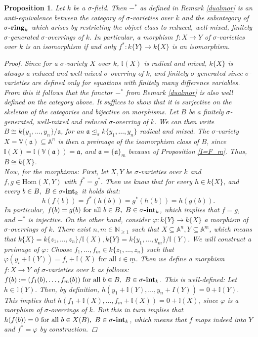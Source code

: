 \documentclass{article}
\def\I{\mathbb{I}}
\def\NE{\mathbb{N}_{\geq1}}
\def\VV{\mathbb{V}}
\def\a{\mathfrak{a}}
\def\s{\sigma}
\def\si{\unlhd_{\sigma}}
\def\Hom{\text{Hom}}
\def\fa{\text{ for all }}
\newcommand{\catname}[1]{{\normalfont\textbf{#1}}}
\newcommand{\sintk}{\s\text{\catname{-int}}_k}
\newcommand{\sringk}{\s\text{\catname{-ring}}_k}
\newenvironment{bew}{\begin{proof}[Proof]}{\end{proof}}
\theoremstyle{plain}
\newtheorem{prop}[Satz]{Proposition}
\theoremstyle{definition}
\begin{document}
\begin{prop}\label{dualisequiv}
Let $k$ be a $\s$-field. Then $-^*$ as defined in Remark \ref{dualmor} is an anti-equivalence between the category of $\s$-varieties over $k$ and the subcategory of $\sringk$ which arises by restricting the object class to reduced, well-mixed, finitely $\s$-generated $\s$-overrings of $k$. 
In particular, a morphism $f: X \rightarrow Y$ of $\s$-varieties over $k$ is an isomorphism if and only $f^*: k\{Y\} \rightarrow k\{X\}$ is an isomorphism.
\begin{bew}
Since for a $\s$-variety $X$ over $k$, $\I(X)$ is radical and mixed, $k\{X\}$ is always a reduced and well-mixed $\s$-overring of $k$, 
and finitely $\s$-generated since $\s$-varieties are defined only for equations with finitely many difference variables. From this it follows that the functor $-^*$ from Remark \ref{dualmor} is also well defined on the category above.
It suffices to show that it is surjective on the skeleton of the categories and bijective on morphisms. 
Let $B$ be a finitely $\s$-generated, well-mixed and reduced $\s$-overring of $k$. We can then write $B \cong k\{y_1,\ldots,y_n\}/\a$, for an $\a \si k\{y_1,\ldots,y_n\}$ radical and mixed. The $\s$-variety $X = \VV(\a) \subseteq \mathbb{A}^n$
is then a preimage of the isomorphism class of $B$, since $\I(X) = \I(\VV(\a)) = \a$, and $\a = \{ \a \}_m$ because of Proposition \ref{I=F_m}. Thus, $B \cong k\{X\}$. \\
\indent Now, for the morphisms: First, let $X,Y$ be $\s$-varieties over $k$ and $f,g \in \Hom(X,Y)$ with $f^* = g^*$. Then we know that for every $h \in k\{X\}$, and every $b \in B, ~ B \in \sintk$ it holds that:
\[ h(f(b)) = f^*(h(b)) = g^*(h(b)) = h(g(b)). \]
In particular, $f(b) = g(b) \fa b \in B, ~ B \in \sintk$, which implies that $f = g$, and $-^*$ is injective. 
On the other hand, consider $\varphi: k\{Y\} \rightarrow k\{X\}$ a morphism of $\s$-overrings of $k$. There exist $n,m \in \NE$ such that $X \subseteq \mathbb{A}^n, Y \subseteq \mathbb{A}^m$,
 which means that $k\{X\} = k\{z_1,\ldots,z_n\}/\I(X), k\{Y\} = k\{y_1,\ldots,y_m\}/\I(Y)$. We will construct a preimage of $\varphi$: Choose $f_1,\ldots,f_m \in k\{z_1,\ldots,z_n\}$ such that $\varphi(y_i + \I(Y)) = f_i + \I(X) \fa i \in \underline{m}$.
Then we define a morphism $f: X \rightarrow Y$ of $\s$-varieties over $k$ as follows: $f(b) := (f_1(b),\ldots,f_m(b)) \fa b \in B, ~ B \in \sintk$. This is well-defined: Let $h \in \I(Y)$. Then, by definition, $h(y_1 + \I(Y),\ldots,y_n + I(Y)) = 0 + \I(Y)$.
This implies that $h(f_1 + \I(X),\ldots,f_m + \I(X)) = 0 + \I(X)$, since $\varphi$ is a morphism of $\s$-overrings of $k$. But this in turn implies that $h(f(b)) = 0 \fa b \in X(B), ~ B \in \sintk$, which means that $f$ maps indeed into $Y$ and $f^* = \varphi$ by construction.
\end{bew}
\end{prop}
\end{document}
